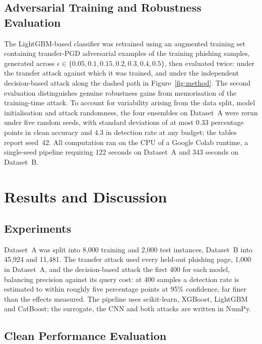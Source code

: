 \documentclass[runningheads]{llncs}
\begin{document}
\subsection{Adversarial Training and Robustness Evaluation}
\label{sec:method-defence}

The LightGBM-based classifier was retrained using an augmented training set
containing transfer-PGD adversarial examples of the training phishing samples,
generated across $\epsilon \in \{0.05, 0.1, 0.15, 0.2, 0.3, 0.4, 0.5\}$, then
evaluated twice: under the transfer attack against which it was trained, and
under the independent decision-based attack along the dashed path in
Figure~\ref{fig:method}. The second evaluation distinguishes genuine robustness
gains from memorisation of the training-time attack. To account for variability
arising from the data split, model initialisation and attack randomness, the four ensembles on Dataset~A were rerun under five random seeds, with
standard deviations of at most 0.33 percentage points in clean accuracy and 4.3
in detection rate at any budget; the tables report seed~42. All computation ran on the CPU of a Google Colab
runtime, a single-seed pipeline requiring 122
seconds on Dataset~A and 343 seconds on Dataset~B.

\section{Results and Discussion}
\label{sec:results}

\subsection{Experiments}
\label{sec:res-setup}

Dataset~A was split into 8,000 training and 2,000 test instances, Dataset~B into
45,924 and 11,481. The transfer attack used every held-out phishing page, 1,000 in Dataset~A, and
the decision-based attack the first 400 for each model, balancing precision
against its query cost:
at 400 samples a detection rate is estimated to within roughly five percentage
points at 95\% confidence, far finer than the effects measured. The pipeline uses scikit-learn, XGBoost, LightGBM and CatBoost; the
surrogate, the CNN and both attacks are written in NumPy.

\subsection{Clean Performance Evaluation}
\label{sec:res-clean}
\end{document}
